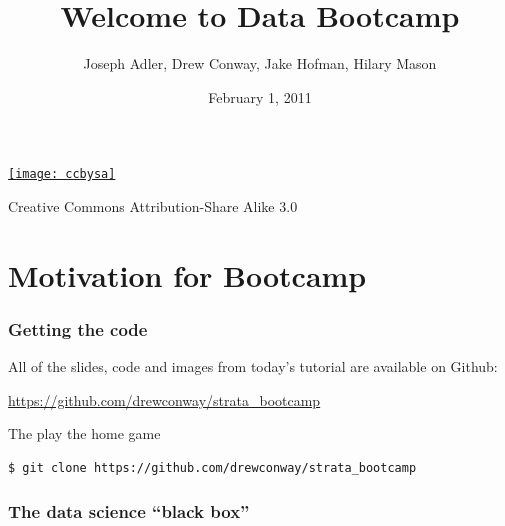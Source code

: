 \documentclass[xcolor=dvipsnames, 9pt]{beamer}
\title{Welcome to Data Bootcamp}
\author{Joseph Adler, Drew Conway, Jake Hofman, Hilary Mason}
\date{February 1, 2011}
\begin{document}
 
    
\begin{frame}[plain]
  \titlepage 

  \tiny
  \href{http://creativecommons.org/licenses/by-sa/3.0/us/}{\texttt{[image: ccbysa]}}

  Creative Commons Attribution-Share Alike 3.0
\end{frame}

\section{Motivation for Bootcamp} %
\label{sec:motivation_for_bootcamp}

\begin{frame}[fragile]
    \frametitle{Getting the code}
    All of the slides, code and images from today's tutorial are available on Github:
    \vspace{1cm}
    \begin{center}
        \LARGE{\url{https://github.com/drewconway/strata_bootcamp}}
    \end{center}
    \vspace{1cm}
    \begin{block}{The play the home game}
        \begin{lstlisting}[language=bash]
$ git clone https://github.com/drewconway/strata_bootcamp
        \end{lstlisting}
    \end{block}
\end{frame}

\begin{frame}[fragile]
    \frametitle{The data science ``black box''}
    \begin{center}
    \end{center}
\end{frame}
\end{document}
